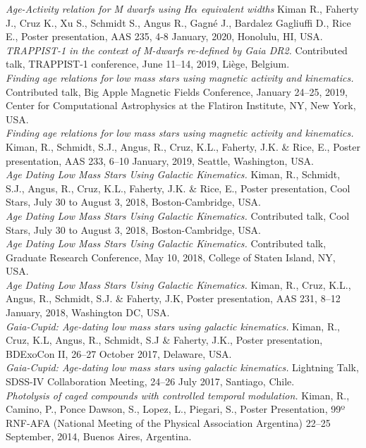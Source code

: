 \documentclass[10pt]{cv}
\begin{document}
\begin{llist}
\textit{Age-Activity relation for M dwarfs using H$\alpha$ equivalent widths} Kiman R., Faherty J., Cruz K., Xu S., Schmidt S., Angus R., Gagn\'e J., Bardalez Gagliuffi D., Rice E., Poster presentation, AAS 235, 4-8 January, 2020, Honolulu, HI, USA.\\
\textit{TRAPPIST-1 in the context of M-dwarfs re-defined by Gaia DR2.} Contributed talk, TRAPPIST-1 conference, June 11--14, 2019, Li\`ege, Belgium.\\
\textit{Finding age relations for low mass stars using magnetic activity and kinematics.} Contributed talk, Big Apple Magnetic Fields Conference, January 24--25, 2019, Center for Computational Astrophysics at the Flatiron Institute, NY, New York, USA. \\
\textit{Finding age relations for low mass stars using magnetic activity and kinematics.} Kiman, R., Schmidt, S.J., Angus, R., Cruz, K.L., Faherty, J.K. \& Rice, E., Poster presentation, AAS 233, 6--10 January, 2019, Seattle, Washington, USA.\\
\textit{Age Dating Low Mass Stars Using Galactic Kinematics.} Kiman, R., Schmidt, S.J., Angus, R., Cruz, K.L., Faherty, J.K. \& Rice, E., Poster presentation, Cool Stars, July 30 to August 3, 2018, Boston-Cambridge, USA.\\
\textit{Age Dating Low Mass Stars Using Galactic Kinematics.} Contributed talk, Cool Stars, July 30 to August 3, 2018, Boston-Cambridge, USA.\\
\textit{Age Dating Low Mass Stars Using Galactic Kinematics.} Contributed talk, Graduate Research Conference, May 10, 2018, College of Staten Island, NY, USA.\\
\textit{Age Dating Low Mass Stars Using Galactic Kinematics.} Kiman, R., Cruz, K.L., Angus, R., Schmidt, S.J. \& Faherty, J.K, Poster presentation, AAS 231, 8--12 January, 2018, Washington DC, USA. \\
\textit{Gaia-Cupid: Age-dating low mass stars using galactic kinematics.} Kiman, R., Cruz, K.L, Angus, R., Schmidt, S.J \& Faherty, J.K., Poster presentation, BDExoCon II, 26--27 October 2017, Delaware, USA. \\
\textit{Gaia-Cupid: Age-dating low mass stars using galactic kinematics.} Lightning Talk, SDSS-IV Collaboration Meeting, 24--26 July 2017, Santiago, Chile. \\
\textit{Photolysis of caged compounds with controlled temporal modulation.} Kiman, R., Camino, P., Ponce Dawson, S., Lopez, L., Piegari, S., Poster Presentation, 99º RNF-AFA (National Meeting of the Physical Association Argentina) 22--25 September, 2014, Buenos Aires, Argentina.


\end{llist}
\end{document}
